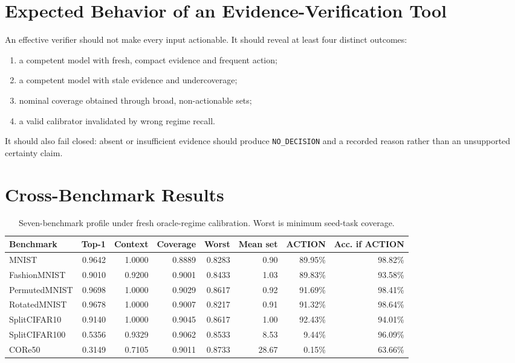 \documentclass[10pt]{article}
\newcommand{\nodecision}{\texttt{NO\_DECISION}}
\begin{document}
\section{Expected Behavior of an Evidence-Verification Tool}
An effective verifier should not make every input actionable. It should reveal at least four distinct outcomes:
\begin{enumerate}[leftmargin=*]
\item a competent model with fresh, compact evidence and frequent action;
\item a competent model with stale evidence and undercoverage;
\item nominal coverage obtained through broad, non-actionable sets;
\item a valid calibrator invalidated by wrong regime recall.
\end{enumerate}
It should also fail closed: absent or insufficient evidence should produce \nodecision{} and a recorded reason rather than an unsupported certainty claim.

\section{Cross-Benchmark Results}
\begin{table}[t]
\centering\small
\caption{Seven-benchmark profile under fresh oracle-regime calibration. Worst is minimum seed-task coverage.}
\begin{tabular}{lrrrrrrr}
\toprule
Benchmark & Top-1 & Context & Coverage & Worst & Mean set & ACTION & Acc. if ACTION\\
\midrule
MNIST & 0.9642 & 1.0000 & 0.8889 & 0.8283 & 0.90 & 89.95\% & 98.82\% \\
FashionMNIST & 0.9010 & 0.9200 & 0.9001 & 0.8433 & 1.03 & 89.83\% & 93.58\% \\
PermutedMNIST & 0.9698 & 1.0000 & 0.9029 & 0.8617 & 0.92 & 91.69\% & 98.41\% \\
RotatedMNIST & 0.9678 & 1.0000 & 0.9007 & 0.8217 & 0.91 & 91.32\% & 98.64\% \\
SplitCIFAR10 & 0.9140 & 1.0000 & 0.9045 & 0.8617 & 1.00 & 92.43\% & 94.01\% \\
SplitCIFAR100 & 0.5356 & 0.9329 & 0.9062 & 0.8533 & 8.53 & 9.44\% & 96.09\% \\
CORe50 & 0.3149 & 0.7105 & 0.9011 & 0.8733 & 28.67 & 0.15\% & 63.66\% \\
\bottomrule
\end{tabular}
\end{table}
\end{document}
